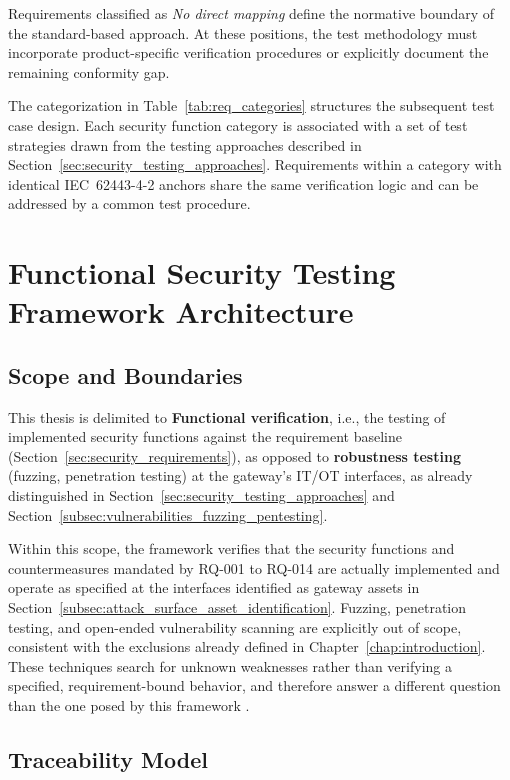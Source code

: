 Requirements classified as \emph{No direct mapping} define the normative boundary of the standard-based approach. At these positions, the test methodology must incorporate product-specific verification procedures or explicitly document the remaining conformity gap.

The categorization in Table~\ref{tab:req_categories} structures the subsequent test case design. Each security function category is associated with a set of test strategies drawn from the testing approaches described in Section~\ref{sec:security_testing_approaches}. Requirements within a category with identical IEC~62443-4-2 anchors share the same verification logic and can be addressed by a common test procedure.



\section{Functional Security Testing Framework Architecture}
\label{sec:framework_architecture}

\subsection{Scope and Boundaries}
\label{subsec:scope_boundaries}

This thesis is delimited to \textbf{Functional verification}, i.e., the testing of implemented security functions against the requirement baseline (Section~\ref{sec:security_requirements}), as opposed to \textbf{robustness testing} (fuzzing, penetration testing) at the gateway's IT/OT interfaces, as already distinguished in Section~\ref{sec:security_testing_approaches} and Section~\ref{subsec:vulnerabilities_fuzzing_pentesting}.

Within this scope, the framework verifies that the security functions and countermeasures mandated by RQ-001 to RQ-014 are actually implemented and operate as specified at the interfaces identified as gateway assets in Section~\ref{subsec:attack_surface_asset_identification}. Fuzzing, penetration testing, and open-ended vulnerability scanning are explicitly out of scope, consistent with the exclusions already defined in Chapter~\ref{chap:introduction}. These techniques search for unknown weaknesses rather than verifying a specified, requirement-bound behavior, and therefore answer a different question than the one posed by this framework \cite[p.8, pp. 29]{richier2011security}.


\subsection{Traceability Model}
\label{subsec:traceability_model}

